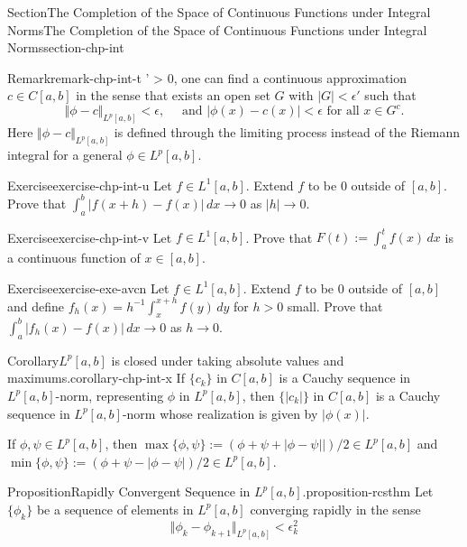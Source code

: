 \documentclass[oneside,10pt,]{article}
\numberwithin{equation}{section}
\begin{document}
\begin{sectionptx}{Section}{The Completion of the Space of Continuous Functions under Integral Norms}{}{The Completion of the Space of Continuous Functions under Integral Norms}{}{}{section-chp-int}
\begin{remark}{Remark}{}{remark-chp-int-t}
\epsilon' > 0\), one can find a continuous approximation \(c\in C[a, b]\) in the sense that exists an open set \(G\) with \(|G| < \epsilon'\) such that%
\begin{equation*}
\Vert \phi - c \Vert_{L^{p}[a, b]} < \epsilon, \quad\text{ and } \vert \phi (x) - c(x) \vert < \epsilon \text{ for all } x\in G^{c}.
\end{equation*}
Here \(\Vert \phi - c \Vert_{L^{p}[a, b]}\) is defined through the limiting process instead of the Riemann integral for a  general \(\phi \in L^{p}[a, b]\).%
\end{remark}
\begin{inlineexercise}{Exercise}{}{exercise-chp-int-u}%
Let \(f \in L^{1}[a,  b]\). Extend \(f\) to be \(0\) outside of \([a, b]\). Prove that \(\int_{a}^{b}|f(x+h)-f(x)|\, dx \to 0\) as \(|h|\to 0\).%
\end{inlineexercise}%
\begin{inlineexercise}{Exercise}{}{exercise-chp-int-v}%
Let \(f \in L^{1}[a,  b]\). Prove that \(F(t) :=\int_{a}^{t} f(x)\, dx\) is a continuous function of \(x\in [a, b]\).%
\end{inlineexercise}%
\begin{inlineexercise}{Exercise}{}{exercise-exe-avcn}%
Let \(f \in L^{1}[a,  b]\). Extend \(f\) to be \(0\) outside of \([a, b]\) and define \(f_{h}(x)=h^{-1}\int_{x}^{x+h} f(y)\, dy\) for \(h > 0\) small. Prove that \(\int_{a}^{b}|f_{h}(x)-f(x)|\, dx \to 0\) as \(h \to 0\).%
\end{inlineexercise}%
\begin{corollary}{Corollary}{\(L^{p}[a, b]\) is closed under taking absolute values and maximums.}{}{corollary-chp-int-x}%
If \(\{ c_{k} \}\) in \(C[a, b]\) is a Cauchy sequence in \(L^{p}[a, b]\)-norm, representing \(\phi\) in \(L^{p}[a, b]\), then  \(\{ |c_{k}| \}\) in \(C[a, b]\) is a Cauchy sequence in \(L^{p}[a, b]\)-norm whose realization is given by \(|\phi (x)|\).%
\par
If \(\phi, \psi\in L^{p}[a, b]\), then \(\max\{\phi, \psi\} :=(\phi + \psi + |\phi - \psi||)/2 
\in L^{p}[a, b]\) and \(\min\{\phi, \psi\} :=(\phi + \psi - |\phi - \psi|)/2 
\in L^{p}[a, b]\).%
\end{corollary}
\begin{proposition}{Proposition}{Rapidly Convergent Sequence in \(L^{p}[a, b]\).}{}{proposition-rcsthm}%
Let \(\{\phi_{k}\}\) be a sequence of elements in \(L^{p}[a, b]\) converging rapidly in the sense%
\begin{equation*}
\Vert \phi_{k} - \phi_{k+1} \Vert_{L^{p}[a, b]} < \epsilon_{k}^{2}

\end{equation*}
\end{proposition}
\end{sectionptx}
\end{document}
